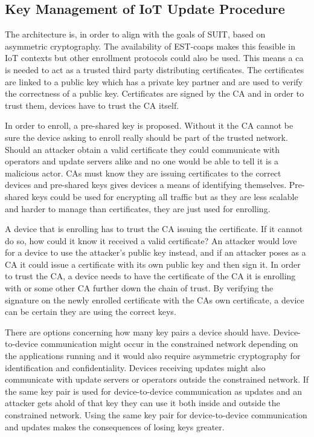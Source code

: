 \documentclass[0-thesis.tex]{subfiles}
\begin{document}
\subsection{Key Management of IoT Update Procedure}
\label{ssec:key-management}
The architecture is, in order to align with the goals of SUIT, based on asymmetric
cryptography. The availability of EST-coaps makes this feasible in IoT contexts but other
enrollment protocols could also be used. This means a \acrfull{ca} is needed to act as
a trusted third party distributing certificates. The certificates are linked to a public
key which has a private key partner and are used to verify the correctness of a public
key. Certificates are signed by the CA and in order to trust them, devices have to trust
the CA itself.

In order to enroll, a pre-shared key is proposed. Without it the CA cannot be sure the
device asking to enroll really should be part of the trusted network. Should an attacker
obtain a valid certificate they could communicate with operators and update servers alike
and no one would be able to tell it is a malicious actor. CAs must know they are issuing
certificates to the correct devices and pre-shared keys gives devices a means of
identifying themselves. Pre-shared keys could be used for encrypting all traffic but as
they are less scalable and harder to manage than certificates, they are just used for
enrolling.

A device that is enrolling has to trust the CA issuing the certificate. If it cannot do
so, how could it know it received a valid certificate? An attacker would love for a device
to use the attacker's public key instead, and if an attacker poses as a CA it could issue
a certificate with its own public key and then sign it. In order to trust the CA, a device
needs to have the certificate of the CA it is enrolling with or some other CA further down
the chain of trust. By verifying the signature on the newly enrolled certificate with the
CAs own certificate, a device can be certain they are using the correct keys.

There are options concerning how many key pairs a device should have. Device-to-device
communication might occur in the constrained network depending on the applications running
and it would also require asymmetric cryptography for identification and confidentiality.
Devices receiving updates might also communicate with update servers or operators outside
the constrained network. If the same key pair is used for device-to-device communication
as updates and an attacker gets ahold of that key they can use it both inside and outside
the constrained network. Using the same key pair for device-to-device communication and
updates makes the consequences of losing keys greater. 
\end{document}
